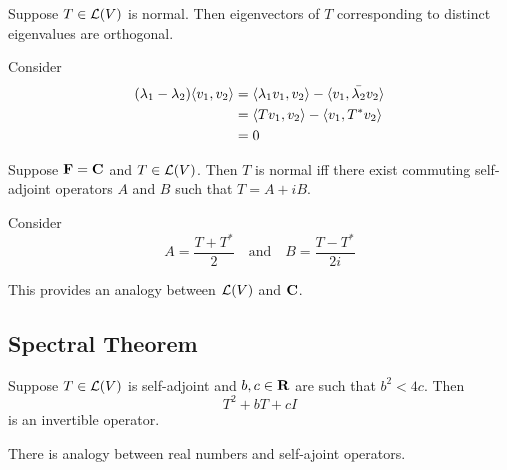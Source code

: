 \documentclass[12pt,a4paper]{article}
\begin{document}
    \begin{prop}
        Suppose $T\in\mathcal{L}(V)$ is normal. Then eigenvectors of $T$ corresponding to distinct eigenvalues are orthogonal.
    \end{prop}
    \begin{remark}
        Consider
        $$
        \begin{aligned}
            (\lambda_1-\lambda_2)\langle v_1,v_2\rangle
            &=\langle\lambda_1v_1,v_2\rangle-\langle v_1,\Bar{\lambda_2}v_2\rangle\\
            &=\langle Tv_1,v_2\rangle-\langle v_1,T^*v_2\rangle\\
            &=0
        \end{aligned}
        $$
    \end{remark}
    \hfill

    \begin{prop}
        Suppose $\mathbf{F}=\mathbf{C}$ and $T\in\mathcal{L}(V)$. Then $T$ is normal iff there exist commuting self-adjoint operators $A$ and $B$ such that $T=A+iB$.
    \end{prop}
    \begin{remark}
        Consider
        $$
        A=\frac{T+T^*}{2}\quad\text{and}\quad B=\frac{T-T^*}{2i}
        $$
    \end{remark}
    \begin{remark}
        This provides an analogy between $\mathcal{L}(V)$ and $\mathbf{C}$.
    \end{remark}
    \hfill

    \subsection{Spectral Theorem}
    \begin{prop}\label{7.17}
        Suppose $T\in\mathcal{L}(V)$ is self-adjoint and $b,c\in\mathbf{R}$ are such that $b^2<4c$. Then
        $$
        T^2+bT+cI
        $$
        is an invertible operator.
    \end{prop}
    \begin{remark}
        There is analogy between real numbers and self-ajoint operators.
    \end{remark}
    \hfill
\end{document}
